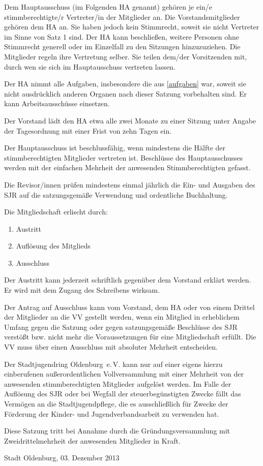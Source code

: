 \documentclass[10pt,a4paper,oneside,parskip=half]{scrartcl}
\begin{document}
\begin{contract}
Dem Hauptausschuss (im Folgenden HA genannt) gehören je ein/e stimmberechtigte/r Vertreter/in der Mitglieder an. Die Vorstandsmitglieder gehören dem HA an. Sie haben jedoch kein Stimmrecht, soweit sie nicht Vertreter im Sinne von Satz 1 sind. Der HA kann beschließen, weitere Personen ohne Stimmrecht generell oder im Einzelfall zu den Sitzungen hinzuzuziehen. Die Mitglieder regeln ihre Vertretung selber. Sie teilen dem/der Vorsitzenden mit, durch wen sie sich im Hauptausschuss vertreten lassen.

Der HA nimmt alle Aufgaben, insbesondere die aus \ref{aufgaben} war, soweit sie nicht ausdrücklich anderen Organen nach dieser Satzung vorbehalten sind. Er kann Arbeitsausschüsse einsetzen.

Der Vorstand lädt den HA etwa alle zwei Monate zu einer Sitzung unter Angabe der Tagesordnung mit einer Frist von zehn Tagen ein.

Der Hauptausschuss ist beschlussfähig, wenn mindestens die Hälfte der stimmberechtigten Mitglieder vertreten ist. Beschlüsse des Hauptausschusses werden mit der einfachen Mehrheit der anwesenden Stimmberechtigten gefasst.

Die Revisor/innen prüfen mindestens einmal jährlich die Ein- und Ausgaben des SJR auf die satzungsgemäße Verwendung und ordentliche Buchhaltung.

\label{mitgliedschaftsende}
Die Mitgliedschaft erlischt durch:
\begin{enumerate}
\item Austritt
\item Auflösung des Mitglieds
\item Ausschluss
\end{enumerate}

Der Austritt kann jederzeit schriftlich gegenüber dem Vorstand erklärt werden. Er wird mit dem Zugang des Schreibens wirksam.

Der Antrag auf Ausschluss kann vom Vorstand, dem HA oder von einem Drittel der Mitglieder an die VV gestellt werden, wenn ein Mitglied in erheblichem Umfang gegen die Satzung oder gegen satzungsgemäße Beschlüsse des SJR verstößt bzw. nicht mehr die Voraussetzungen für eine Mitgliedschaft erfüllt. Die VV muss über einen Ausschluss mit absoluter Mehrheit entscheiden.

Der Stadtjugendring Oldenburg~e.\,V. kann nur auf einer eigens hierzu einberufenen außerordentlichen Vollversammlung mit einer Mehrheit von  der anwesenden stimmberechtigten Mitglieder aufgelöst werden.
Im Falle der Auflösung des SJR oder bei Wegfall der steuerbegünstigten Zwecke fällt das Vermögen an die Stadtjugendpflege, die es ausschließlich für Zwecke der Förderung der Kinder- und Jugendverbandsarbeit zu verwenden hat.

Diese Satzung tritt bei Annahme durch die Gründungsversammlung mit Zweidrittelmehrheit der anwesenden Mitglieder in Kraft.

\end{contract}
\vspace{1cm}
Stadt Oldenburg, 03. Dezember 2013
\end{document}
